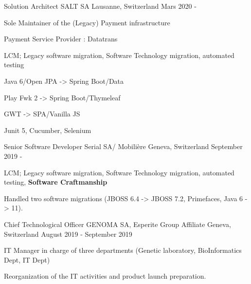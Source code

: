 

\begin{cventries}
        
        \cventry
        {Solution Architect} %
        {SALT SA} %
        {Lausanne, Switzerland} %
        {Mars 2020 - } %
        {
            \begin{cvitems} %
                \item{Sole Maintainer of the (Legacy) Payment infrastructure}
                \item{Payment Service Provider : Datatrans}
                \item{LCM; Legacy software migration, Software Technology migration, automated testing}
                \item{Java 6/Open JPA -> Spring Boot/Data}
                \item{Play Fwk 2 -> Spring Boot/Thymeleaf}
                \item{GWT -> SPA/Vanilla JS}
                \item{Junit 5, Cucumber, Selenium}
            \end{cvitems}
        }

        \cventry
        {Senior Software Developer} %
        {Serial SA/ Mobilière} %
        {Geneva, Switzerland} %
        {September 2019 - } %
        {
            \begin{cvitems} %
                \item{LCM; Legacy software migration, Software Technology migration, automated testing, \textbf{Software Craftmanship}}
                \item{Handled two software migrations (JBOSS 6.4 -> JBOSS 7.2, Primefaces, Java 6 -> 11).}
            \end{cvitems}
        }

        \cventry
        {Chief Technological Officer} %
        {GENOMA SA, Esperite Group Affiliate} %
        {Geneva, Switzerland} %
        {August 2019 - September 2019 } %
        {
            \begin{cvitems} %
                \item{IT Manager in charge of three departments (Genetic laboratory, BioInformatics Dept, IT Dept)}
                \item{Reorganization of the IT activities and product launch preparation.}
            \end{cvitems}
        }


\end{cventries}
